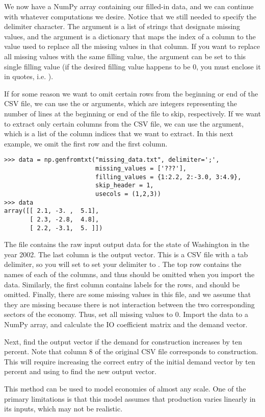 We now have a NumPy array containing our filled-in data, and we can continue with whatever computations we desire. Notice
that we still needed to specify the delimiter character. The  argument is a list of strings that 
designate missing values, and the  argument is a dictionary that maps the index of a column to the 
value used to replace all the missing values in that column.  
If you want to replace all missing values with the same
filling value, the  argument can be set to this single filling value (if the desired filling value
happens to be 0, you must enclose it in quotes, i.e. ).

If for some reason we want to omit certain rows from the beginning or end of the CSV file, we can use the  or 
arguments, which are integers representing the number of lines at the beginning or end of the file to skip, respectively.
If we want to extract only certain columns from the CSV file, we can use the  argument, which is a list of
the column indices that we want to extract. In this next example, we omit the first row and the first column.

\begin{lstlisting}
>>> data = np.genfromtxt("missing_data.txt", delimiter=';',
                         missing_values = ['???'],
                         filling_values = {1:2.2, 2:-3.0, 3:4.9},
                         skip_header = 1,
                         usecols = (1,2,3))
>>> data
array([[ 2.1, -3. ,  5.1],
       [ 2.3, -2.8,  4.8],
       [ 2.2, -3.1,  5. ]])

\end{lstlisting}

\begin{problem}
The file  contains the raw input output data for the state of Washington in the year 2002.
The last column is the output vector. This is a CSV file with a tab delimiter, so you will set to set your 
delimiter to . The top row contains the names of each of the columns, and thus should be omitted when
you import the data. Similarly, the first column contains labels for the rows, and should be omitted. Finally,
there are some missing values in this file, and we assume that they are missing because there is not interaction
between the two corresponding sectors of the economy. Thus, set all missing values to 0. Import the data
to a NumPy array, and calculate the IO coefficient matrix and the demand vector.

Next, find the output vector if the demand for construction increases by ten percent.
Note that column 8 of the original CSV file corresponds to construction.
This will require increasing the correct entry of the initial 
demand vector by ten percent and using  to find the new output vector.
\end{problem}

This method can be used to model economies of almost any scale.
One of the primary limitations is that this model assumes that production varies linearly in its inputs, which may not be realistic.
